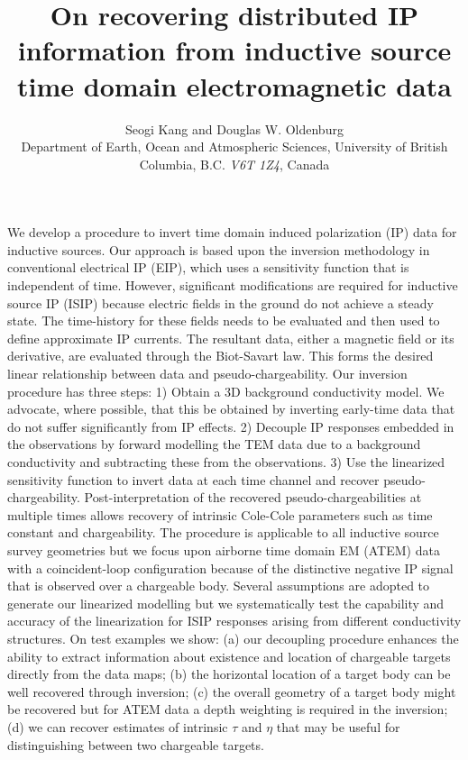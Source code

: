 \documentclass[extra,mreferee]{gji}
\author[Seogi Kang and Douglas W. Oldenburg]
   {Seogi Kang and Douglas W. Oldenburg \\
    Department of Earth, Ocean and Atmospheric Sciences,
    University of British Columbia,
    B.C. \emph{V6T 1Z4}, Canada
  }
\title{On recovering distributed IP information from inductive source time domain electromagnetic data}
\begin{document}
\label{firstpage}

\maketitle




\begin{summary}
We develop a procedure to invert time domain induced polarization (IP) data for inductive sources. Our approach is based upon the inversion methodology in conventional electrical IP (EIP), which uses a sensitivity function that is independent of time. However, significant modifications are required for inductive source IP (ISIP) because electric fields in the ground do not achieve a steady state. The time-history for these fields needs to be evaluated and then used to define approximate IP currents. The resultant data, either a magnetic field or its derivative, are evaluated through the Biot-Savart law. This forms the desired linear relationship between data and pseudo-chargeability.
Our inversion procedure has three steps:
1) Obtain a 3D background conductivity model. We advocate, where possible, that this be obtained by inverting early-time data that do not suffer significantly from IP effects.
2) Decouple IP responses embedded in the observations by forward modelling the TEM data due to a background conductivity and subtracting these from the observations. 3) Use the linearized sensitivity function to invert data at each time channel and recover pseudo-chargeability. Post-interpretation of the recovered pseudo-chargeabilities at multiple times allows recovery of intrinsic Cole-Cole parameters such as time constant and chargeability. The procedure is applicable to all inductive source survey geometries but we focus upon airborne time domain EM (ATEM) data with a coincident-loop configuration because of the distinctive negative IP signal that is observed over a chargeable body.
Several assumptions are adopted to generate our linearized modelling but we systematically test the capability and accuracy of the linearization for ISIP responses arising from different conductivity structures. On test examples we show: (a) our decoupling procedure enhances the ability to extract information about existence and location of chargeable targets directly from the data maps; (b) the horizontal location of a target body can be well recovered through inversion; (c) the overall geometry of a target body might be recovered but for ATEM data a depth weighting is required in the inversion; (d)  we can recover estimates of intrinsic $\tau$ and $\eta$ that may be useful for distinguishing between two chargeable targets.
\end{summary}
\end{document}
